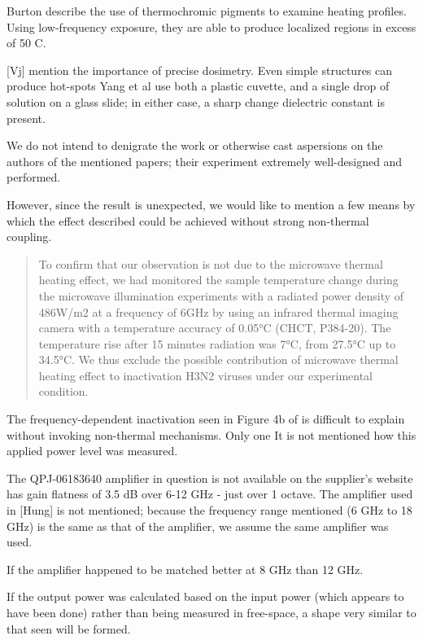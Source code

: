 \documentclass[paper.tex]{subfiles}
\begin{document}
\begin{multicols}{1}
Burton\cite{Effects1950} describe the use of thermochromic pigments to examine heating profiles. Using low-frequency exposure, they are able to produce localized regions in excess of 50 C.






[Vj] mention the importance of precise dosimetry. Even simple structures can produce hot-spots 
Yang et al use both a plastic cuvette, and a single drop of solution on a glass slide; in either case, a sharp change dielectric constant is present.


We do not intend to denigrate the work or otherwise cast aspersions on the authors of the mentioned papers; their experiment extremely well-designed and performed. 

However, since the result is unexpected, we would like to mention a few means by which the effect described could be achieved without strong non-thermal coupling.

\begin{quote}
	
	To confirm that our observation is not due to the microwave thermal heating effect, we had monitored the sample temperature change during the microwave illumination experiments with a radiated power density of 486W/m2 at a frequency of 6GHz by using an infrared thermal imaging camera with a temperature accuracy of 0.05°C (CHCT, P384-20). The temperature rise after 15 minutes radiation was 7°C, from 27.5°C up to 34.5°C. We thus exclude the possible contribution of microwave thermal heating effect to inactivation H3N2 viruses under our experimental condition.
	
\end{quote}

The frequency-dependent inactivation seen in Figure 4b of \cite{Efficient2015} is difficult to explain without invoking non-thermal mechanisms. Only one  It is not mentioned how this applied power level was measured. 

The QPJ-06183640 amplifier in question is not available on the supplier's website \cite{Microwaved} has gain flatness of 3.5 dB over 6-12 GHz - just over 1 octave. The amplifier used in [Hung] is not mentioned; because the frequency range mentioned (6 GHz to 18 GHz) is the same as that of the amplifier, we assume the same amplifier was used. 

If the amplifier happened to be matched better at 8 GHz than 12 GHz.

If the output power was calculated based on the input power (which appears to have been done) rather than being measured in free-space, a shape very similar to that seen will be formed.


\end{multicols}
\end{document}
